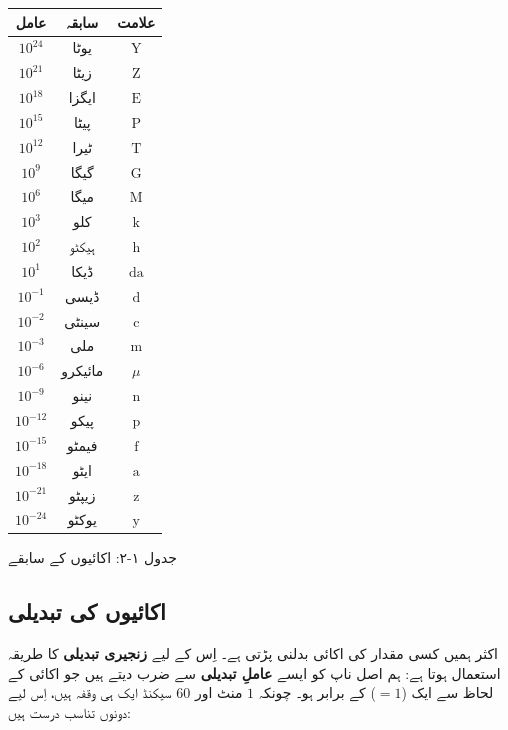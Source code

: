 \documentclass{urdu-textbook}
\begin{document}
\begin{longtable}[]{@{}ccc@{}}
\toprule\noalign{}
عامل & سابقہ & علامت \\
\midrule\noalign{}
\endhead
\bottomrule\noalign{}
\endlastfoot
\(10^{24}\) & یوٹا & \(\mathrm{Y}\) \\
\(10^{21}\) & زیٹا & \(\mathrm{Z}\) \\
\(10^{18}\) & ایگزا & \(\mathrm{E}\) \\
\(10^{15}\) & پیٹا & \(\mathrm{P}\) \\
\(10^{12}\) & ٹیرا & \(\mathrm{T}\) \\
\(10^{9}\) & گیگا & \(\mathrm{G}\) \\
\(10^{6}\) & میگا & \(\mathrm{M}\) \\
\(10^{3}\) & کلو & \(\mathrm{k}\) \\
\(10^{2}\) & ہیکٹو & \(\mathrm{h}\) \\
\(10^{1}\) & ڈیکا & \(\mathrm{da}\) \\
\(10^{-1}\) & ڈیسی & \(\mathrm{d}\) \\
\(10^{-2}\) & سینٹی & \(\mathrm{c}\) \\
\(10^{-3}\) & ملی & \(\mathrm{m}\) \\
\(10^{-6}\) & مائیکرو & \(\mu\) \\
\(10^{-9}\) & نینو & \(\mathrm{n}\) \\
\(10^{-12}\) & پیکو & \(\mathrm{p}\) \\
\(10^{-15}\) & فیمٹو & \(\mathrm{f}\) \\
\(10^{-18}\) & ایٹو & \(\mathrm{a}\) \\
\(10^{-21}\) & زیپٹو & \(\mathrm{z}\) \\
\(10^{-24}\) & یوکٹو & \(\mathrm{y}\) \\
\end{longtable}

جدول ۱-۲:  اکائیوں کے سابقے

\hypertarget{ux627ux6a9ux627ux626ux6ccux648ux6ba-ux6a9ux6cc-ux62aux628ux62fux6ccux644ux6cc}{%
\subsection{اکائیوں کی
تبدیلی}\label{ux627ux6a9ux627ux626ux6ccux648ux6ba-ux6a9ux6cc-ux62aux628ux62fux6ccux644ux6cc}}

اکثر ہمیں کسی مقدار کی اکائی بدلنی پڑتی ہے۔ اِس کے لیے \textbf{زنجیری
تبدیلی} کا طریقہ استعمال ہوتا ہے: ہم اصل ناپ کو ایسے \textbf{عاملِ
تبدیلی} سے ضرب دیتے ہیں جو اکائی کے لحاظ سے ایک (\(=1\)) کے برابر ہو۔
چونکہ \(1\) منٹ اور \(60\) سیکنڈ ایک ہی وقفہ ہیں، اِس لیے دونوں تناسب
درست ہیں:
\end{document}
